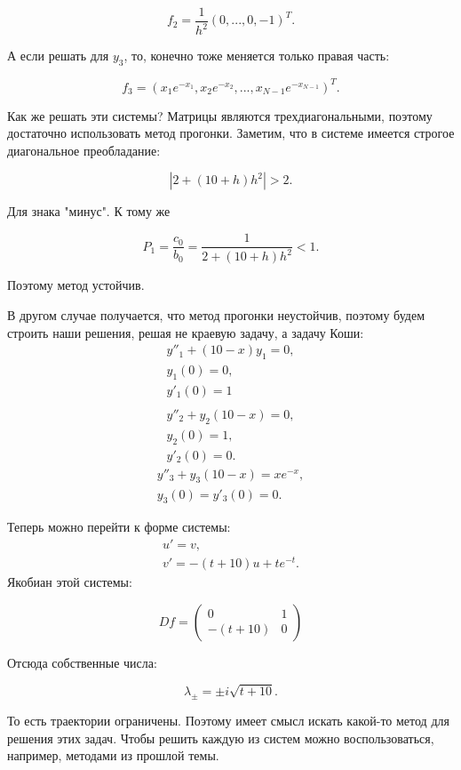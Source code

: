 \documentclass[a4paper]{article}
\begin{document}
\begin{sol}
$$
f_2 = \frac{1}{h^2} (0,...,0, -1)^{T}.
$$

А если решать для $y_3$, то, конечно тоже меняется только правая часть:

$$
f_3 = (x_1 e^{-x_1}, x_2 e^{-x_2},..., x_{N-1} e^{-x_{N-1}})^{T}.
$$

Как же решать эти системы? Матрицы являются трехдиагональными, поэтому достаточно использовать метод прогонки.
Заметим, что в системе имеется строгое диагональное преобладание:

$$
|2 + (10+h)h^2| > 2.
$$

Для знака "минус". К тому же

$$
P_1 = \frac{c_0}{b_0} = \frac{1}{2 + (10+h)h^2} <1.
$$

Поэтому метод устойчив.

В другом случае получается, что метод прогонки неустойчив, поэтому будем строить наши решения, решая не краевую задачу, а задачу Коши:
\begin{gather*}
y''_1 + (10-x)y_1 = 0,\\
y_1(0) = 0,\\
y'_1(0) = 1\\
\end{gather*}
\begin{gather*}
y''_2 + y_2(10-x) = 0,\\
y_2(0) = 1,\\
y'_2(0) = 0.
\end{gather*}
\begin{gather*}
y''_3 + y_3(10-x) = xe^{-x},\\
y_3(0) = y'_3(0) = 0.
\end{gather*}

Теперь можно перейти к форме системы:
\begin{gather*}
u' = v,\\
v' = -(t+10)u + t e^{-t}.
\end{gather*}
Якобиан этой системы:

$$
Df = \begin{pmatrix}
0 & 1\\
-(t+10) & 0
\end{pmatrix}
$$

Отсюда собственные числа:

$$
\lambda_\pm = \pm i\sqrt{t+10}.
$$

То есть траектории ограничены. Поэтому имеет смысл искать какой-то метод для решения этих задач. Чтобы решить каждую из систем можно воспользоваться, например, методами из прошлой темы.
\end{sol}
\end{document}
